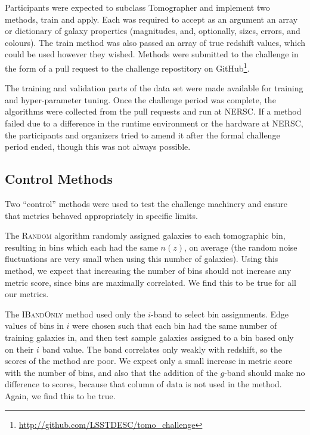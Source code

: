 \documentclass[twocolumn,twocolappendix]{aastex63}
\begin{document}
Participants were expected to subclass
{\sc Tomographer} and implement two methods, {\sc train} and {\sc apply}.  Each
was required to accept as an argument an array or dictionary of galaxy properties
(magnitudes, and, optionally, sizes, errors, and colours).  The {\sc train} method
was also passed an array of true redshift values, which could be used however they wished.
Methods were submitted to the challenge in the form of a pull request to the challenge
repostitory on GitHub\footnote{\url{http://github.com/LSSTDESC/tomo_challenge}}.

The training and validation parts of the data set were made available for training
and hyper-parameter tuning. Once the challenge period was complete, the algorithms
were collected from the pull requests and run at NERSC. If a method failed due to a difference in the
runtime environment or the hardware at NERSC, the participants and organizers tried
to amend it after the formal challenge period ended, though this was not always possible.



\subsection{Control Methods}

Two ``control'' methods were used to test the challenge machinery and ensure
that metrics behaved appropriately in specific limits.

The \textsc{Random} algorithm randomly assigned galaxies to each tomographic bin, resulting
in bins which each had the same $n(z)$, on average (the random noise fluctuations
are very small when using this number of galaxies).  Using this method, we expect
that increasing the number of bins should not increase any metric score, since bins are
maximally correlated.  We find this to be true for all our metrics.

The \textsc{IBandOnly} method used only the $i$-band to select bin assignments.
Edge values of bins in $i$ were chosen such that each bin had the same number of training galaxies in,
and then test sample galaxies assigned to a bin based only on their $i$ band value. The band correlates
only weakly with redshift, so the scores of the method are poor.
We expect only a small
increase in metric score with the number of bins, and also that the addition of the $g$-band
should make no difference to scores, because that column of data is not used in the method.  Again, we find this to be true.
\end{document}
